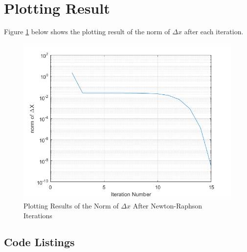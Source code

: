 \documentclass[a4paper,titlepage]{article}
\begin{document}
	\section{Plotting Result}
		Figure \ref{result} below shows the plotting result of the norm of $\Delta x$ after each iteration. 
		\begin{figure}[H]
			\centering
			\includegraphics[width=0.5\linewidth]{result}
			\caption{Plotting Results of the Norm of $\Delta x$ After Newton-Raphson Iterations}
			\label{result}
		\end{figure}
	\begin{appendices}
		
		\section{Code Listings} \label{appendix:code}
		
		
		\begin{center}
			\inputminted{matlab}{../../src/a2/nlJacobian.m}
			\label{jacobian}
		\end{center}
		
		\begin{center}
			\inputminted{matlab}{../../src/a2/dcsolve.m}
			\label{dc}
		\end{center}
	\end{appendices}
\end{document}
